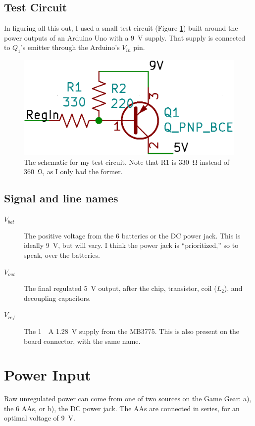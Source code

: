\documentclass{article}
\newcommand{\Vbat}{$V_{bat}$}
\newcommand{\Vout}{$V_{out}$}
\newcommand{\Vref}{$V_{ref}$}
\begin{document}
\subsection{Test Circuit}
In figuring all this out, I used a small test circuit (Figure
\ref{fig:test_circuit_schematic}) built around the power outputs of an
Arduino Uno with a \qty{9}{\volt} supply. That supply is connected to
$Q_1$'s emitter through the Arduino's $V_{in}$ pin.

\begin{figure}
  \centering
  \includegraphics[width=\textwidth]{test_circuit_schematic}
  \caption{The schematic for my test circuit. Note that R1 is
    \qty{330}{\ohm} instead of \qty{360}{\ohm}, as I only had the
    former.}
  \label{fig:test_circuit_schematic}
\end{figure}


\subsection{Signal and line names}
\begin{description}
\item[\Vbat{}] The positive voltage from the 6 batteries or the DC power
  jack. This is ideally \qty{9}{\volt}, but will vary. I think the
  power jack is ``prioritized,'' so to speak, over the batteries.
\item[\Vout{}] The final regulated \qty{5}{\volt} output, after the
  chip, transistor, coil ($L_2$), and decoupling capacitors.
\item[\Vref{}] The \qty{1}{\milli{}A} \qty{1.28}{\volt} supply from the
  MB3775. This is also present on the board connector, with the same
  name.
\end{description}

\section{Power Input}
Raw unregulated power can come from one of two sources on the Game
Gear: a), the 6 AAs, or b), the DC power jack. The AAs are connected
in series, for an optimal voltage of \qty{9}{\volt}.
\end{document}
